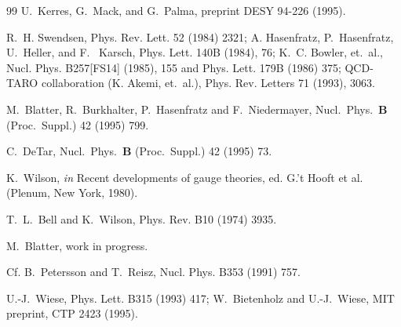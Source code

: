 \begin{thebibliography}{99}
U.~Kerres, G.~Mack, and G.~Palma,  preprint DESY 94-226 (1995).

R.~H. Swendsen, Phys. Rev. Lett. 52 (1984) 2321;
A. Hasenfratz, P.~Hasenfratz, U.~Heller, and F. ~Karsch,
Phys. Lett. 140B (1984), 76;
K.~C. Bowler, et.~al., Nucl. Phys. B257[FS14] (1985), 155 and Phys. Lett.
179B (1986) 375;
QCD-TARO collaboration (K. Akemi, et.~al.), Phys. Rev. Letters 71 (1993), 3063.

M.~Blatter, R.~Burkhalter, P.~Hasenfratz and F.~Niedermayer, 
Nucl.\ Phys.\ {\bf B} (Proc.\ Suppl.) 42 (1995) 799.

C.~DeTar, Nucl.\ Phys.\ {\bf B} (Proc.\ Suppl.) 42 (1995) 73.

K.~Wilson, {\it in} Recent developments of gauge theories,
ed. G.'t Hooft et al. (Plenum, New York, 1980).

T.~L.~Bell and K.~Wilson, Phys. Rev. B10 (1974) 3935.

M.~Blatter, work in progress.

Cf. B.~Petersson and T.~Reisz, Nucl. Phys. B353 (1991) 757.

U.-J.~Wiese, Phys. Lett. B315 (1993) 417;
W.~Bietenholz and U.-J.~Wiese, MIT preprint, CTP 2423 (1995).

%


\end{thebibliography}
\eject


 


